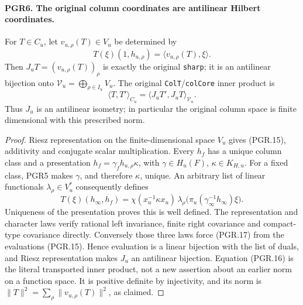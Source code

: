 \paragraph{PGR6. The original column coordinates are antilinear Hilbert coordinates.}
\label{claim:PGR6}
For \(T\in C_u\), let \(v_{u,\rho}(T)\in V_u\) be determined by
\[
       T(\xi)(1,h_{u,\rho})
                    =\langle v_{u,\rho}(T),\xi\rangle.
\tag{PGR.15}
\]
Then \(J_uT=(v_{u,\rho}(T))_\rho\) is exactly the original
\texttt{sharp}; it is an antilinear bijection onto
\(\mathcal V_u=\bigoplus_{\rho\in I_u}V_u\).  The original
\texttt{ColT}/\texttt{colCore} inner product is
\[
       \langle T,T'\rangle_{C_u}=\langle J_uT',J_uT\rangle_{\mathcal V_u}.
\tag{PGR.16}
\]
Thus \(J_u\) is an antilinear isometry; in particular the original
column space is finite dimensional with this prescribed norm.
\begin{proof}
Riesz representation on the finite-dimensional space \(V_u\)
gives (PGR.15), additivity and conjugate scalar multiplication.
Every \(h_f\) has a unique column class and a presentation
\(h_f=\gamma_fh_{u,\rho}\kappa\), with
\(\gamma\in H_u(F)\), \(\kappa\in K_{H,u}\).
For a fixed class, PGR5 makes \(\gamma\), and therefore
\(\kappa\), unique.  An arbitrary list of linear functionals
\(\lambda_\rho\in V_u^*\) consequently defines
\[
 T(\xi)(h_\infty,h_f)
   =\chi(x_u^{-1}\kappa x_u)\,
              \lambda_\rho\bigl(\pi_u(\gamma_\infty^{-1}h_\infty)\xi\bigr).
\tag{PGR.17}
\]
Uniqueness of the presentation proves this is well defined.  The
representation and character laws verify rational left invariance,
finite right covariance and compact-type covariance directly.
Conversely those three laws force (PGR.17) from the evaluations
(PGR.15).  Hence evaluation is a linear bijection with the list of
duals, and Riesz representation makes \(J_u\) an antilinear
bijection.  Equation (PGR.16) is the literal transported inner product,
not a new assertion about an earlier norm on a function space.
It is positive definite by injectivity, and its norm is
\(\|T\|^2=\sum_\rho\|v_{u,\rho}(T)\|^2\), as claimed.
\end{proof}

